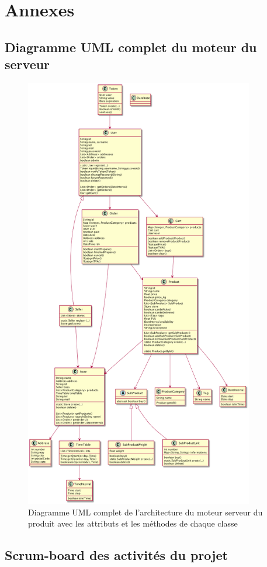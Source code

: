 \documentclass[a4paper, 12pt]{article}
\begin{document}
\newpage
\section*{Annexes}
\subsection*{Diagramme UML complet du moteur du serveur}

\begin{figure}[H]
	\begin{center}
		\includegraphics[width=10cm]{fig/uml-all.png}
		\caption*{Diagramme UML complet de l'architecture du moteur serveur du produit avec les attributs et les méthodes de chaque classe}
	\end{center}
\end{figure}

\newpage
\subsection*{Scrum-board des activités du projet}
\end{document}
